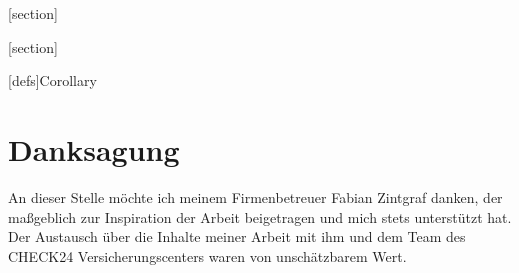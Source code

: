 



[section]

[section]

 
[defs]{Corollary}

\setcounter{secnumdepth}{3}





\setcounter{page}{1}




\chapter*{Danksagung}
An dieser Stelle möchte ich meinem Firmenbetreuer Fabian Zintgraf danken,
der maßgeblich zur Inspiration der Arbeit beigetragen und mich stets unterstützt hat.
Der Austausch über die Inhalte meiner Arbeit mit ihm und dem Team des CHECK24
Versicherungscenters waren von unschätzbarem Wert.

